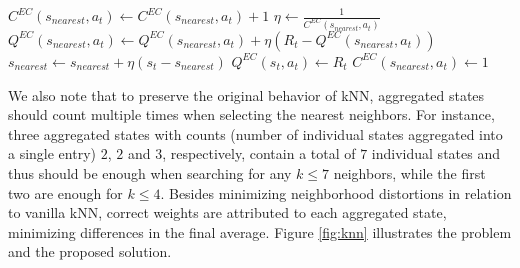 \documentclass{article}
\begin{document}
\begin{algorithm}[htb]
\begin{algorithmic}[1]
          
                \State $C^{EC}(s_{nearest}, a_t) \leftarrow C^{EC}(s_{nearest}, a_t) + 1$ 
                \State $\eta \leftarrow \frac{1}{C^{EC}(s_{nearest}, a_t)}$  
                \State $Q^{EC}(s_{nearest}, a_t) \leftarrow  Q^{EC}(s_{nearest}, a_t) + \eta \left( R_t - Q^{EC}(s_{nearest}, a_t) \right)$  
                \State $s_{nearest} \leftarrow s_{nearest} + \eta \left( s_t - s_{nearest} \right)$  
        \Else   {}
            \State $Q^{EC}(s_t, a_t) \leftarrow R_t$  
            \State $C^{EC}(s_{nearest}, a_t) \leftarrow 1$ 
        \EndIf
    \EndFor
\EndFor
\end{algorithmic}
\label{alg:samfec}
\end{algorithm}

We also note that to preserve the original behavior of kNN, aggregated states should count multiple times when selecting the nearest neighbors. For instance, three aggregated states with counts (number of individual states aggregated into a single entry) $2$, $2$ and $3$, respectively, contain a total of $7$ individual states and thus should be enough when searching for any $k \leq 7$ neighbors, while the first two are enough for $k \leq 4$. Besides minimizing neighborhood distortions in relation to vanilla kNN, correct weights are attributed to each aggregated state, minimizing differences in the final average. Figure \ref{fig:knn} illustrates the problem and the proposed solution.
\end{document}
